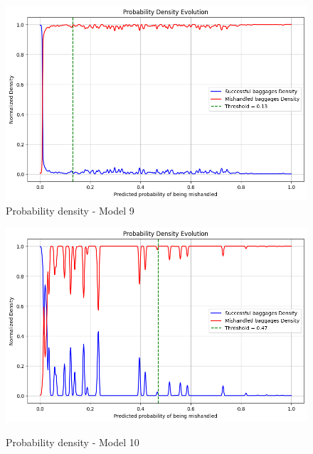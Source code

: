 \documentclass[12pt]{article}
\begin{document}
\begin{figure}
\begin{minipage}[c]{0.5\linewidth}
    \includegraphics[width=1\textwidth]{Probability_density_Model 9.png}\\
    \caption{Probability density - Model 9}
\end{minipage}
\hfill
\begin{minipage}[c]{0.5\linewidth}
    \includegraphics[width=1\textwidth]{Probability_density_Model 10.png}\\
    \caption{Probability density - Model 10}
\end{minipage}%
\end{figure}
\end{document}
